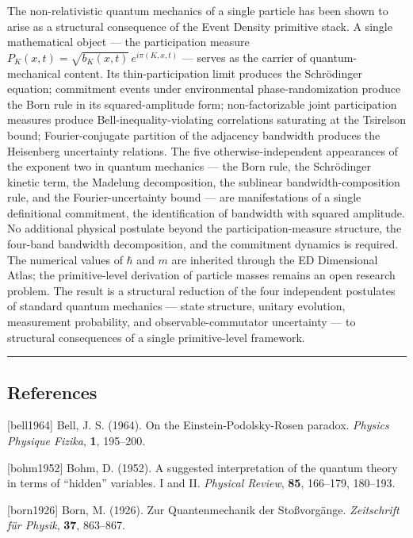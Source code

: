 \documentclass[
  11pt,
]{article}
\begin{document}
The non-relativistic quantum mechanics of a single particle has been
shown to arise as a structural consequence of the Event Density
primitive stack. A single mathematical object --- the participation
measure \(P_K(x,t) = \sqrt{b_K(x,t)} \, e^{i\pi(K,x,t)}\) --- serves as
the carrier of quantum-mechanical content. Its thin-participation limit
produces the Schrödinger equation; commitment events under environmental
phase-randomization produce the Born rule in its squared-amplitude form;
non-factorizable joint participation measures produce
Bell-inequality-violating correlations saturating at the Tsirelson
bound; Fourier-conjugate partition of the adjacency bandwidth produces
the Heisenberg uncertainty relations. The five otherwise-independent
appearances of the exponent two in quantum mechanics --- the Born rule,
the Schrödinger kinetic term, the Madelung decomposition, the sublinear
bandwidth-composition rule, and the Fourier-uncertainty bound --- are
manifestations of a single definitional commitment, the identification
of bandwidth with squared amplitude. No additional physical postulate
beyond the participation-measure structure, the four-band bandwidth
decomposition, and the commitment dynamics is required. The numerical
values of \(\hbar\) and \(m\) are inherited through the ED Dimensional
Atlas; the primitive-level derivation of particle masses remains an open
research problem. The result is a structural reduction of the four
independent postulates of standard quantum mechanics --- state
structure, unitary evolution, measurement probability, and
observable-commutator uncertainty --- to structural consequences of a
single primitive-level framework.

\begin{center}\rule{0.5\linewidth}{0.5pt}\end{center}

\subsection{References}\label{references}

{[}bell1964{]} Bell, J. S. (1964). On the Einstein-Podolsky-Rosen
paradox. \emph{Physics Physique Fizika}, \textbf{1}, 195--200.

{[}bohm1952{]} Bohm, D. (1952). A suggested interpretation of the
quantum theory in terms of ``hidden'' variables. I and II.
\emph{Physical Review}, \textbf{85}, 166--179, 180--193.

{[}born1926{]} Born, M. (1926). Zur Quantenmechanik der Stoßvorgänge.
\emph{Zeitschrift für Physik}, \textbf{37}, 863--867.
\end{document}
